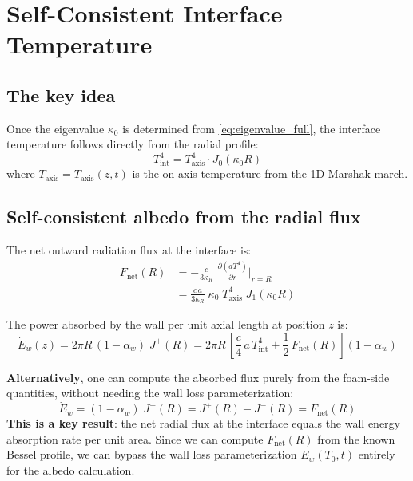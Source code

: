 \documentclass[12pt]{article}
\newcommand{\alphaW}{\alpha_w}
\newcommand{\Ew}{\dot{E}_w}
\newcommand{\pder}[2]{\frac{\partial #1}{\partial #2}}
\begin{document}
\section{Self-Consistent Interface Temperature}

\subsection{The key idea}

Once the eigenvalue $\kappa_0$ is determined from \eqref{eq:eigenvalue_full},
the interface temperature follows directly from the radial profile:
\begin{equation}
    \boxed{T_{\mathrm{int}}^4 = T_{\mathrm{axis}}^4 \cdot J_0(\kappa_0 R)}
    \label{eq:T_interface}
\end{equation}
where $T_{\mathrm{axis}} = T_{\mathrm{axis}}(z,t)$ is the on-axis temperature from
the 1D Marshak march.

\subsection{Self-consistent albedo from the radial flux}

The net outward radiation flux at the interface is:
\begin{align}
    F_{\mathrm{net}}(R) &= -\frac{c}{3\kappa_R}\;\pder{(aT^4)}{r}\bigg|_{r=R}
    \nonumber \\
    &= \frac{c\,a}{3\kappa_R}\;\kappa_0\;T_{\mathrm{axis}}^4\;J_1(\kappa_0 R)
    \label{eq:F_at_R}
\end{align}

The power absorbed by the wall per unit axial length at position $z$ is:
\begin{equation}
    \dot{E}_w(z) = 2\pi R\,(1 - \alphaW)\;J^+(R)
    = 2\pi R\,\left[\frac{c}{4}\,a\,T_{\mathrm{int}}^4
    + \frac{1}{2}\,F_{\mathrm{net}}(R)\right](1 - \alphaW)
    \label{eq:Ew_from_flux}
\end{equation}

\textbf{Alternatively}, one can compute the absorbed flux purely from the
foam-side quantities, without needing the wall loss parameterization:
\begin{equation}
    \Ew = (1 - \alphaW)\;J^+(R) = J^+(R) - J^-(R) = F_{\mathrm{net}}(R)
    \label{eq:Ew_equals_Fnet}
\end{equation}
\textbf{This is a key result}: the net radial flux at the interface equals the
wall energy absorption rate per unit area. Since we can compute $F_{\mathrm{net}}(R)$
from the known Bessel profile, we can bypass the wall loss parameterization
$E_w(T_0, t)$ entirely for the albedo calculation.
\end{document}
